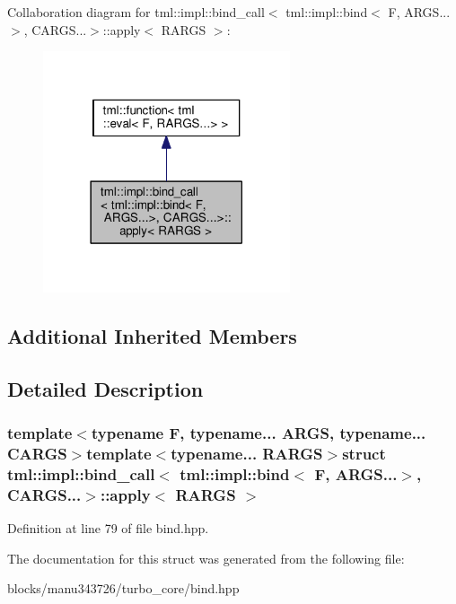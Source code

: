 Collaboration diagram for tml\+:\+:impl\+:\+:bind\+\_\+call$<$ tml\+:\+:impl\+:\+:bind$<$ F, A\+R\+G\+S...$>$, C\+A\+R\+G\+S...$>$\+:\+:apply$<$ R\+A\+R\+G\+S $>$\+:
\nopagebreak
\begin{figure}[H]
\begin{center}
\leavevmode
\includegraphics[width=206pt]{structtml_1_1impl_1_1bind__call_3_01tml_1_1impl_1_1bind_3_01_f_00_01_a_r_g_s_8_8_8_4_00_01_c_a_r83af6cc02f516f95603693fbc1e5eb0a}
\end{center}
\end{figure}
\subsection*{Additional Inherited Members}


\subsection{Detailed Description}
\subsubsection*{template$<$typename F, typename... A\+R\+G\+S, typename... C\+A\+R\+G\+S$>$template$<$typename... R\+A\+R\+G\+S$>$struct tml\+::impl\+::bind\+\_\+call$<$ tml\+::impl\+::bind$<$ F, A\+R\+G\+S...$>$, C\+A\+R\+G\+S...$>$\+::apply$<$ R\+A\+R\+G\+S $>$}



Definition at line 79 of file bind.\+hpp.



The documentation for this struct was generated from the following file\+:\begin{DoxyCompactItemize}
\item 
blocks/manu343726/turbo\+\_\+core/bind.\+hpp\end{DoxyCompactItemize}
